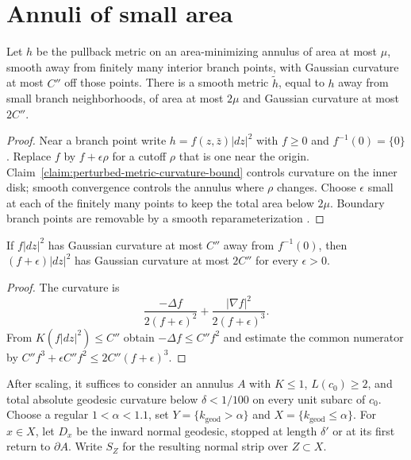 \section{Annuli of small area}
\label{18.5}

\begin{claim}
\label{claim:branch-point-metric-deformation}
Let $h$ be the pullback metric on an area-minimizing annulus of area at most
$\mu$, smooth away from finitely many interior branch points, with Gaussian
curvature at most $C''$ off those points. There is a smooth metric
$\widetilde h$, equal to $h$ away from small branch neighborhoods, of area at
most $2\mu$ and Gaussian curvature at most $2C''$.
\end{claim}
\begin{proof}
\sketch Near a branch point write $h=f(z,\bar z)|dz|^2$ with $f\ge0$ and
$f^{-1}(0)=\{0\}$. Replace $f$ by $f+\epsilon\rho$ for a cutoff $\rho$ that is
one near the origin. Claim~\ref{claim:perturbed-metric-curvature-bound} controls
curvature on the inner disk; smooth convergence controls the annulus where
$\rho$ changes. Choose $\epsilon$ small at each of the finitely many points to
keep the total area below $2\mu$. Boundary branch points are removable by a
smooth reparameterization \cite{White}.
\end{proof}

\begin{claim}
\label{claim:perturbed-metric-curvature-bound}
If $f|dz|^2$ has Gaussian curvature at most $C''$ away from $f^{-1}(0)$, then
$(f+\epsilon)|dz|^2$ has Gaussian curvature at most $2C''$ for every
$\epsilon>0$.
\end{claim}
\begin{proof}
\sketch The curvature is
\[
\frac{-\Delta f}{2(f+\epsilon)^2}
+\frac{|\nabla f|^2}{2(f+\epsilon)^3}.
\]
From $K(f|dz|^2)\le C''$ obtain $-\Delta f\le C''f^2$ and estimate the common
numerator by $C''f^3+\epsilon C''f^2\le2C''(f+\epsilon)^3$.
\end{proof}

After scaling, it suffices to consider an annulus $A$ with $K\le1$,
$L(c_0)\ge2$, and total absolute geodesic curvature below $\delta<1/100$ on
every unit subarc of $c_0$. Choose a regular $1<\alpha<1.1$, set
$Y=\{k_{\mathrm{geod}}>\alpha\}$ and $X=\{k_{\mathrm{geod}}\le\alpha\}$. For
$x\in X$, let $D_x$ be the inward normal geodesic, stopped at length
$\delta'$ or at its first return to $\partial A$. Write $S_Z$ for the resulting
normal strip over $Z\subset X$.

